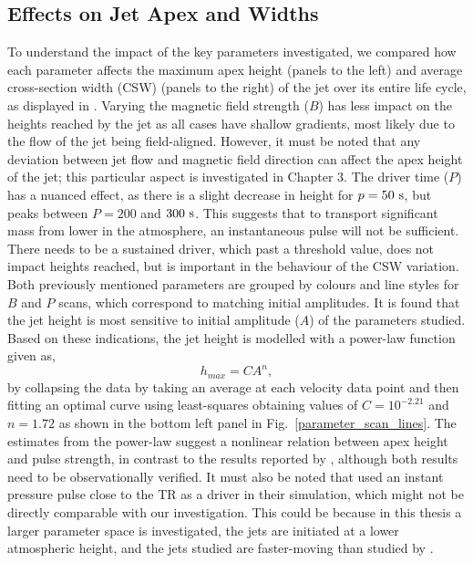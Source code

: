 \subsection{Effects on Jet Apex and Widths}
\label{subsec:jet_apex_widths}
To understand the impact of the key parameters investigated, we compared how each parameter affects the maximum apex height (panels to the left) and average cross-section width (CSW) (panels to the right) of the jet over its entire life cycle, as displayed in . Varying the magnetic field strength ($B$) has less impact on the heights reached by the jet as all cases have shallow gradients, most likely due to the flow of the jet being field-aligned. However, it must be noted that any deviation between jet flow and magnetic field direction can affect the apex height of the jet; this particular aspect is investigated in Chapter 3. The driver time ($P$) has a nuanced effect, as there is a slight decrease in height for $p=50~\rm{s}$, but peaks between $P=200$ and $300~\rm{s}$. This suggests that to transport significant mass from lower in the atmosphere, an instantaneous pulse will not be sufficient. There needs to be a sustained driver, which past a threshold value, does not impact heights reached, but is important in the behaviour of the CSW variation. Both previously mentioned parameters are grouped by colours and line styles for $B$ and $P$ scans, which correspond to matching initial amplitudes. It is found that the jet height is most sensitive to initial amplitude ($A$) of the parameters studied. Based on these indications, the jet height is modelled with a power-law function given as,  
\begin{equation}
h_{max} = C A^{n},
\end{equation}
by collapsing the data by taking an average at each velocity data point and then fitting an optimal curve using least-squares obtaining values of $C= 10^{-2.21}$ and $n= 1.72$ as shown in the bottom left panel in Fig.~\ref{parameter_scan_lines}. The estimates from the power-law suggest a nonlinear relation between apex height and pulse strength, in contrast to the results reported by \citet{Singh2019}, although both results need to be observationally verified. It must also be noted that \citet{Singh2019} used an instant pressure pulse close to the TR as a driver in their simulation, which might not be directly comparable with our investigation. This could be because in this thesis a larger parameter space is investigated, the jets are initiated at a lower atmospheric height, and the jets studied are faster-moving than studied by \citet{Singh2019}. \np 
